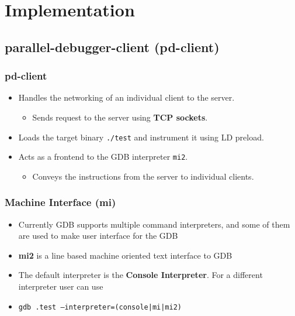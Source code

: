 \documentclass{beamer}
\begin{document}
\section{Implementation}
\subsection{parallel-debugger-client (pd-client)}

\begin{frame}
  \frametitle{pd-client}
  \begin{itemize}
  \item <1-> Handles the networking of an individual client to the server.
    \begin{itemize}
      \item <2-> Sends request to the server using \textbf{TCP sockets}.
    \end{itemize}
    \item  <3-> Loads the target binary \texttt{./test} and instrument it using
    LD preload.
  \item <4-> Acts as a frontend to the GDB interpreter \texttt{mi2}.
    \begin{itemize}
    \item <5-> Conveys the instructions from the server to individual clients.
    \end{itemize}
  \end{itemize}
\end{frame}

\begin{frame}
  \frametitle{Machine Interface (mi)}
  \begin{itemize}
  \item <1-> {Currently GDB supports multiple command interpreters, and
      some of them are used to make user interface for the GDB}
  \item <2-> {\textbf{mi2} is a line based machine oriented text interface to
    GDB}
\item <3-> {The default interpreter is the \textbf{Console Interpreter}. For
   a different interpreter user can use}
\item <3-> {\texttt{gdb .test --interpreter=(console|mi|mi2)}}
\end{itemize}
\end{frame}
\end{document}

